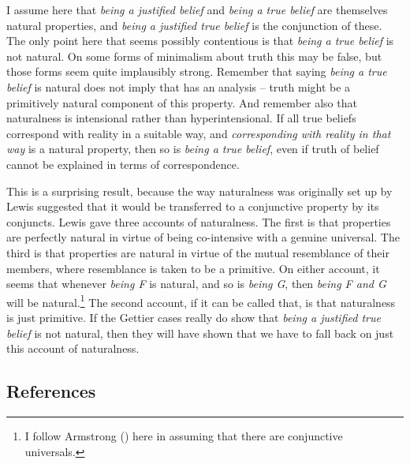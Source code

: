 \documentclass[
  11pt,
  letterpaper,
  DIV=11,
  numbers=noendperiod,
  twoside]{scrartcl}
\begin{document}
I assume here that \emph{being a justified belief} and \emph{being a
true belief} are themselves natural properties, and \emph{being a
justified true belief} is the conjunction of these. The only point here
that seems possibly contentious is that \emph{being a true belief} is
not natural. On some forms of minimalism about truth this may be false,
but those forms seem quite implausibly strong. Remember that saying
\emph{being a true belief} is natural does not imply that has an
analysis -- truth might be a primitively natural component of this
property. And remember also that naturalness is intensional rather than
hyperintensional. If all true beliefs correspond with reality in a
suitable way, and \emph{corresponding with reality in that way} is a
natural property, then so is \emph{being a true belief}, even if truth
of belief cannot be explained in terms of correspondence.

This is a surprising result, because the way naturalness was originally
set up by Lewis suggested that it would be transferred to a conjunctive
property by its conjuncts. Lewis gave three accounts of naturalness. The
first is that properties are perfectly natural in virtue of being
co-intensive with a genuine universal. The third is that properties are
natural in virtue of the mutual resemblance of their members, where
resemblance is taken to be a primitive. On either account, it seems that
whenever \emph{being F} is natural, and so is \emph{being G}, then
\emph{being F and G} will be natural.\footnote{I follow Armstrong
  () here in assuming that
  there are conjunctive universals.} The second account, if it can be
called that, is that naturalness is just primitive. If the Gettier cases
really do show that \emph{being a justified true belief} is not natural,
then they will have shown that we have to fall back on just this account
of naturalness.

\subsection*{References}\label{references}
\end{document}
